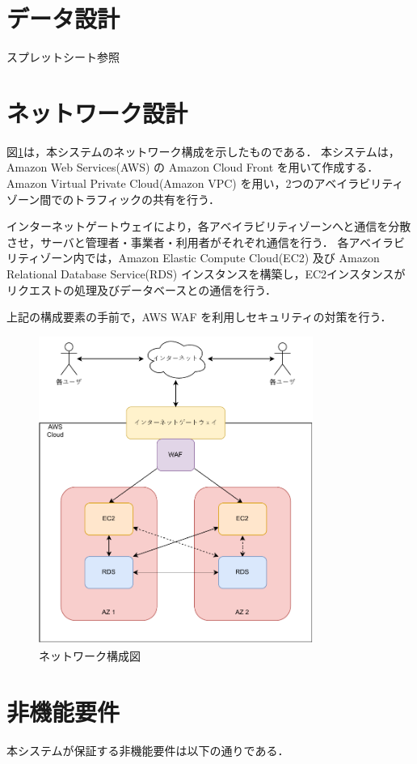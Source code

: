 \documentclass[a4paper, titlepage]{jsarticle}
\begin{document}
\section{データ設計}
スプレットシート参照
\section{ネットワーク設計}
図\ref{fig:network}は，本システムのネットワーク構成を示したものである．
本システムは，Amazon Web Services(AWS) の Amazon Cloud Front を用いて作成する．
Amazon Virtual Private Cloud(Amazon VPC) を用い，2つのアベイラビリティゾーン間でのトラフィックの共有を行う．

インターネットゲートウェイにより，各アベイラビリティゾーンへと通信を分散させ，サーバと管理者・事業者・利用者がそれぞれ通信を行う．
各アベイラビリティゾーン内では，Amazon Elastic Compute Cloud(EC2) 及び Amazon Relational Database Service(RDS) インスタンスを構築し，EC2インスタンスがリクエストの処理及びデータベースとの通信を行う．

上記の構成要素の手前で，AWS WAF を利用しセキュリティの対策を行う．

\begin{figure}[H]
  \includegraphics[width=0.8\textwidth]{./other/network_img.pdf}
  \caption{ネットワーク構成図}
  \label{fig:network}
\end{figure}

\section{非機能要件}
本システムが保証する非機能要件は以下の通りである．
\end{document}
